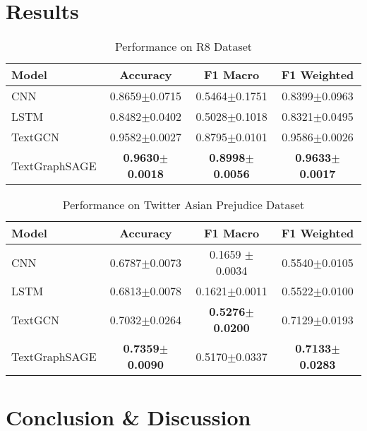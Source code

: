 \documentclass{article}
\begin{document}
\section{Results}

\begin{table}[H]
\centering
\caption{Performance on R8 Dataset}
\label{table:R8-results}
\begin{tabular}{lccc}
\hline
\textbf{Model} & \textbf{Accuracy} & \textbf{F1 Macro} & \textbf{F1 Weighted} \\ \hline
CNN &  0.8659$\pm$0.0715 & 0.5464$\pm$0.1751 & 0.8399$\pm$0.0963\\
LSTM & 0.8482$\pm$0.0402 & 0.5028$\pm$0.1018 & 0.8321$\pm$0.0495  \\
TextGCN & 0.9582$\pm$0.0027& 0.8795$\pm$0.0101 & 0.9586$\pm$0.0026 \\
TextGraphSAGE & \textbf{0.9630$\pm$0.0018} & \textbf{0.8998$\pm$0.0056} & \textbf{0.9633$\pm$0.0017} \\ \hline
\end{tabular}
\end{table}

\begin{table}[H]
\centering
\caption{Performance on Twitter Asian Prejudice Dataset}
\label{table:Twitter-results}
\begin{tabular}{lccc}
\hline
\textbf{Model} & \textbf{Accuracy} & \textbf{F1 Macro} & \textbf{F1 Weighted} \\ \hline
CNN & 0.6787$\pm$0.0073 & 0.1659 $\pm$ 0.0034 & 0.5540$\pm$0.0105 \\
LSTM & 0.6813$\pm$0.0078 & 0.1621$\pm$0.0011 & 0.5522$\pm$0.0100 \\
TextGCN & 0.7032$\pm$0.0264  & \textbf{0.5276$\pm$0.0200} & 0.7129$\pm$0.0193 \\
TextGraphSAGE & \textbf{0.7359$\pm$0.0090} & 0.5170$\pm$0.0337& \textbf{0.7133$\pm$0.0283} \\ \hline
\end{tabular}
\end{table}


\section{Conclusion \& Discussion}
\end{document}
